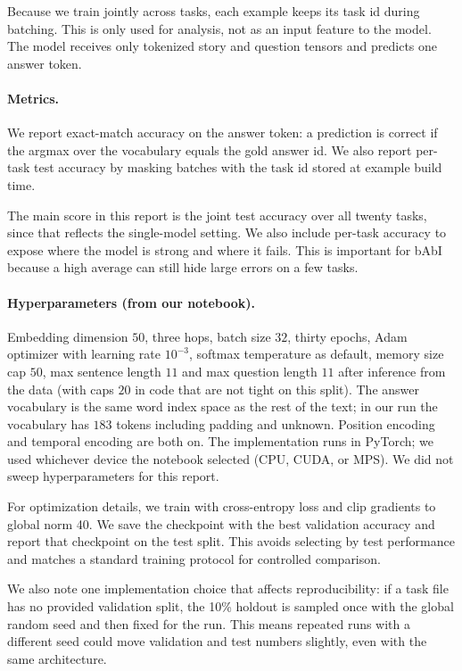 \documentclass{article}
\begin{document}
Because we train jointly across tasks, each example keeps its task id during batching. This is only used for analysis, not as an input feature to the model. The model receives only tokenized story and question tensors and predicts one answer token.

\paragraph{Metrics.}
We report exact-match accuracy on the answer token: a prediction is correct if the argmax over the vocabulary equals the gold answer id. We also report per-task test accuracy by masking batches with the task id stored at example build time.

The main score in this report is the joint test accuracy over all twenty tasks, since that reflects the single-model setting. We also include per-task accuracy to expose where the model is strong and where it fails. This is important for bAbI because a high average can still hide large errors on a few tasks.

\paragraph{Hyperparameters (from our notebook).}
Embedding dimension $50$, three hops, batch size $32$, thirty epochs, Adam optimizer with learning rate $10^{-3}$, softmax temperature as default, memory size cap $50$, max sentence length $11$ and max question length $11$ after inference from the data (with caps $20$ in code that are not tight on this split). The answer vocabulary is the same word index space as the rest of the text; in our run the vocabulary has $183$ tokens including padding and unknown. Position encoding and temporal encoding are both on. The implementation runs in PyTorch; we used whichever device the notebook selected (CPU, CUDA, or MPS). We did not sweep hyperparameters for this report.

For optimization details, we train with cross-entropy loss and clip gradients to global norm 40. We save the checkpoint with the best validation accuracy and report that checkpoint on the test split. This avoids selecting by test performance and matches a standard training protocol for controlled comparison.

We also note one implementation choice that affects reproducibility: if a task file has no provided validation split, the 10\% holdout is sampled once with the global random seed and then fixed for the run. This means repeated runs with a different seed could move validation and test numbers slightly, even with the same architecture.
\end{document}
